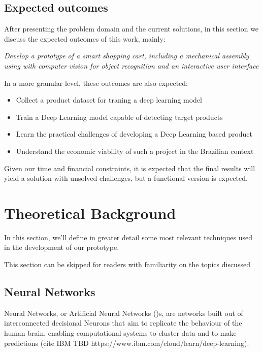 \documentclass[openright]{normas-utf-tex} %
\begin{document}
\section{Expected outcomes}

After presenting the problem domain and the current solutions, in this section we discuss the expected
outcomes of this work, mainly:

\textit{Develop a prototype of a smart shopping cart, including a mechanical assembly using with computer vision for object recognition
and an interactive user interface}

In a more granular level, these outcomes are also expected:

\begin{itemize}
    \item Collect a product dataset for traning a deep learning model
    \item Train a Deep Learning model capable of detecting target products
	\item Learn the practical challenges of developing a Deep Learning based product
    \item Understand the economic viability of such a project in the Brazilian context
\end{itemize}

Given our time and financial constraints, it is expected that the final results will yield
a solution with unsolved challenges, but a functional version is expected.

\chapter{Theoretical Background}

In this section, we'll define in greater detail some most relevant techniques
used in the development of our prototype.

This section can be skipped for readers with familiarity on the topics discussed

\section{Neural Networks}

Neural Networks, or Artificial Neural Networks ()s,
are networks built out of interconnected decisional Neurons that aim to replicate 
the behaviour of the human brain, enabling computational systems to cluster data
and to make predictions (cite IBM TBD https://www.ibm.com/cloud/learn/deep-learning). 
\end{document}
